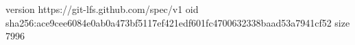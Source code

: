 version https://git-lfs.github.com/spec/v1
oid sha256:ace9cee6084e0ab0a473bf5117ef421edf601fc4700632338baad53a7941cf52
size 7996
